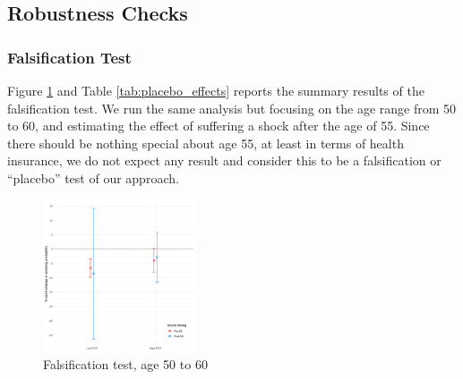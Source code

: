 \subsection{Robustness Checks}
\label{supsec:robustness}

\subsubsection{Falsification Test} \label{appsec:placebo}
Figure \ref{fig:placebo} and Table \ref{tab:placebo_effects} reports the summary results of the falsification test.
We run the same analysis but focusing on the age range from 50 to 60, and estimating the effect of suffering a shock after the age of 55.
Since there should be nothing special about age 55, at least in terms of health insurance, we do not expect any result and consider this to be a falsification or ``placebo'' test of our approach.

\begin{figure}[!ht]
	\begin{center}
		\includegraphics[width=0.4\textwidth]{../3_output/shock_effects/placebo_5060_100_cv.png}
		\caption{Falsification test, age 50 to 60
		\label{fig:placebo}
		}
	\vspace{-0.8cm}
	\end{center}
\end{figure}


